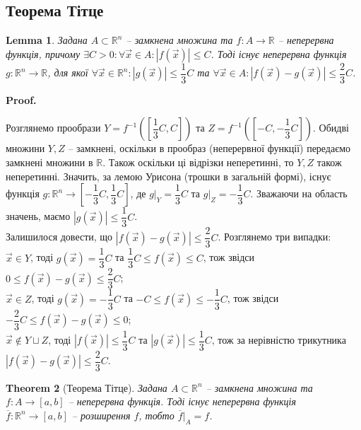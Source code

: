 \documentclass[a4paper, 10pt]{article}
\makeatletter
\def\qed{$\blacksquare$}
\theoremstyle{theoremdd}
\newtheorem{theorem}{Theorem}[subsection]
\theoremstyle{theoremdd}
\theoremstyle{theoremdd}
\theoremstyle{theoremdd}
\theoremstyle{theoremdd}
\theoremstyle{theoremdd}
\theoremstyle{theoremdd}
\newtheorem{lemma}[theorem]{Lemma}
\theoremstyle{theoremdd}
\renewenvironment{proof}[1][Proof.\\]{\par
\pushQED{\hfill \qed}%
\normalfont \topsep6\p@\@plus6\p@\relax
\trivlist
\item\relax
{\bfseries
#1\@addpunct{.}}\hspace\labelsep\ignorespaces
}{%
\popQED\endtrivlist\@endpefalse
}
\makeatother
\begin{document}
\subsection{Теорема Тітце}
\begin{lemma}
Задана $A \subset \mathbb{R}^n$ -- замкнена множина та $f \colon A \to \mathbb{R}$ -- неперервна функція, причому $\exists C > 0: \forall \vec{x} \in A: |f(\vec{x})| \leq C$. Тоді існує неперервна функція $g \colon \mathbb{R}^n \to \mathbb{R}$, для якої $\forall \vec{x} \in \mathbb{R}^n: |g(\vec{x})| \leq \dfrac{1}{3}C$ та $\forall \vec{x} \in A: |f(\vec{x}) - g(\vec{x})| \leq \dfrac{2}{3}C$.
\end{lemma}

\begin{proof}
Розглянемо прообрази $Y = f^{-1}\left(\left[\dfrac{1}{3}C,C\right]\right)$ та $Z = f^{-1}\left(\left[-C, -\dfrac{1}{3}C \right]\right)$. Обидві множини $Y,Z$ -- замкнені, оскільки в прообраз (неперервної функції) передаємо замкнені множини в $\mathbb{R}$. Також оскільки ці відрізки неперетинні, то $Y,Z$ також неперетинні. Значить, за лемою Урисона (трошки в загальній формі), існує функція $g \colon \mathbb{R}^n \to \left[-\dfrac{1}{3}C, \dfrac{1}{3}C\right]$, де $g|_Y = \dfrac{1}{3}C$ та $g|_Z = -\dfrac{1}{3}C$. Зважаючи на область значень, маємо $|g(\vec{x})| \leq \dfrac{1}{3}C$. \\
Залишилося довести, що $|f(\vec{x}) - g(\vec{x})| \leq \dfrac{2}{3}C$. Розглянемо три випадки:\\
$\vec{x} \in Y$, тоді $g(\vec{x}) = \dfrac{1}{3}C$ та $\dfrac{1}{3}C \leq f(\vec{x}) \leq C$, тож звідси $0 \leq f(\vec{x}) - g(\vec{x}) \leq \dfrac{2}{3}C$;\\
$\vec{x} \in Z$, тоді $g(\vec{x}) = -\dfrac{1}{3}C$ та $-C \leq f(\vec{x}) \leq -\dfrac{1}{3}C$, тож звідси $-\dfrac{2}{3}C \leq f(\vec{x}) - g(\vec{x}) \leq 0$;\\
$\vec{x} \notin Y \sqcup Z$, тоді $|f(\vec{x})| \leq \dfrac{1}{3}C$ та $|g(\vec{x})| \leq \dfrac{1}{3}C$, тож за нерівністю трикутника $|f(\vec{x}) - g(\vec{x})| \leq \dfrac{2}{3}C$.
\end{proof}

\begin{theorem}[Теорема Тітце]
Задана $A \subset \mathbb{R}^n$ -- замкнена множина та $f \colon A \to [a,b]$ -- неперервна функція. Тоді існує неперервна функція $\overline{f} \colon \mathbb{R}^n \to [a,b]$ -- розширення $f$, тобто $\overline{f}|_{A} = f$.
\end{theorem}
\end{document}

